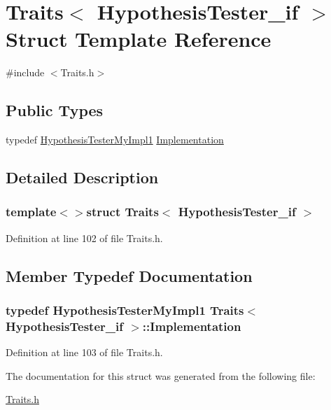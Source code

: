 \hypertarget{struct_traits_3_01_hypothesis_tester__if_01_4}{\section{Traits$<$ Hypothesis\-Tester\-\_\-if $>$ Struct Template Reference}
\label{struct_traits_3_01_hypothesis_tester__if_01_4}
}


{\ttfamily \#include $<$Traits.\-h$>$}

\subsection*{Public Types}
\begin{DoxyCompactItemize}
\item 
typedef \hyperlink{class_hypothesis_tester_my_impl1}{Hypothesis\-Tester\-My\-Impl1} \hyperlink{struct_traits_3_01_hypothesis_tester__if_01_4_a5fd3508bb7c3e86b2b16161c70eae52f}{Implementation}
\end{DoxyCompactItemize}


\subsection{Detailed Description}
\subsubsection*{template$<$$>$struct Traits$<$ Hypothesis\-Tester\-\_\-if $>$}



Definition at line 102 of file Traits.\-h.



\subsection{Member Typedef Documentation}
\hypertarget{struct_traits_3_01_hypothesis_tester__if_01_4_a5fd3508bb7c3e86b2b16161c70eae52f}{
\subsubsection[{Implementation}]{\setlength{\rightskip}{0pt plus 5cm}typedef {\bf Hypothesis\-Tester\-My\-Impl1} {\bf Traits}$<$ {\bf Hypothesis\-Tester\-\_\-if} $>$\-::{\bf Implementation}}}\label{struct_traits_3_01_hypothesis_tester__if_01_4_a5fd3508bb7c3e86b2b16161c70eae52f}


Definition at line 103 of file Traits.\-h.



The documentation for this struct was generated from the following file\-:\begin{DoxyCompactItemize}
\item 
\hyperlink{_traits_8h}{Traits.\-h}\end{DoxyCompactItemize}
